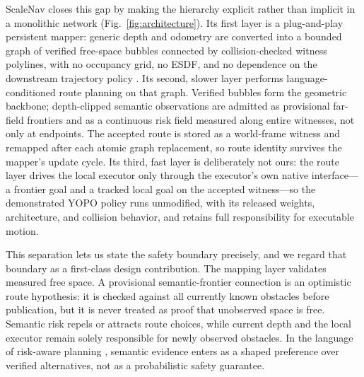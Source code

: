 \documentclass[letterpaper,10pt,conference]{ieeeconf}
\begin{document}
ScaleNav closes this gap by making the hierarchy explicit rather than
implicit in a monolithic network (Fig.~\ref{fig:architecture}).  Its first
layer is a plug-and-play persistent mapper: generic depth and odometry are
converted into a bounded graph of verified free-space bubbles connected by
collision-checked witness polylines, with no occupancy grid, no ESDF, and no
dependence on the downstream trajectory policy
\cite{bubble,epic,sfc}.  Its second, slower layer performs language-conditioned
route planning on that graph.  Verified bubbles form the geometric backbone;
depth-clipped semantic observations are admitted as provisional far-field
frontiers and as a continuous risk field measured along entire witnesses, not
only at endpoints.  The accepted route is stored as a world-frame witness and
remapped after each atomic graph replacement, so route identity survives the
mapper's update cycle.  Its third, fast layer is deliberately not ours: the
route layer drives the local executor only through the executor's own native
interface---a frontier goal and a tracked local goal on the accepted
witness---so the demonstrated YOPO policy \cite{yopo} runs unmodified, with
its released weights, architecture, and collision behavior, and retains full
responsibility for executable motion.

This separation lets us state the safety boundary precisely, and we regard
that boundary as a first-class design contribution.  The mapping layer
validates measured free space.  A provisional semantic-frontier connection is
an optimistic route hypothesis: it is checked against all currently known
obstacles before publication, but it is never treated as proof that
unobserved space is free.  Semantic risk repels or attracts route choices,
while current depth and the local executor remain solely responsible for
newly observed obstacles.  In the language of risk-aware planning
\cite{majumdar,blackmore}, semantic evidence enters as a shaped preference
over verified alternatives, not as a probabilistic safety guarantee.
\end{document}
